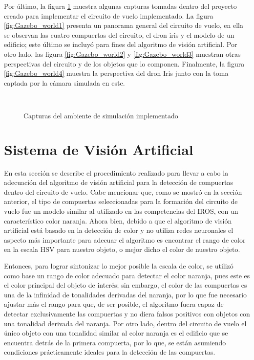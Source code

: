 Por último, la figura \ref{fig:Gazebo_worlds} muestra algunas capturas tomadas dentro del proyecto creado para implementar el circuito de vuelo implementado. La figura \ref{fig:Gazebo_world1} presenta un panorama general del circuito de vuelo, en ella se observan las cuatro compuertas del circuito, el dron iris y el modelo de un edificio; este último se incluyó para fines del algoritmo de visión artificial. Por otro lado, las figura \ref{fig:Gazebo_world2} y \ref{fig:Gazebo_world3}  muestran otras perspectivas del circuito y de los objetos que lo componen. Finalmente, la figura \ref{fig:Gazebo_world4} muestra la perspectiva del dron Iris junto con la toma captada por la cámara simulada en este.

\begin{figure}[ht]
    \centering
    \hfill
    \\
    \hfill
    \hfill

    \caption{Capturas del ambiente de simulación implementado}
    \label{fig:Gazebo_worlds}
\end{figure}

\newpage


\section{Sistema de Visión Artificial}
En esta sección se describe el procedimiento realizado para llevar a cabo la adecuación del algoritmo de visión artificial para la detección de compuertas dentro del circuito de vuelo. Cabe mencionar que, como se mostró en la sección anterior, el tipo de compuertas seleccionadas para la formación del circuito de vuelo fue un modelo similar al utilizado en las competencias del IROS, con un característico color naranja. Ahora bien, debido a que el algoritmo de visión artificial está basado en la detección de color y no utiliza redes neuronales el aspecto más importante para adecuar el algoritmo es encontrar el rango de color en la escala HSV para nuestro objeto, o mejor dicho el color de nuestro objeto.

Entonces, para lograr sintonizar lo mejor posible la escala de color, se utilizó como base un rango de color adecuado para detectar el color naranja, pues este es el color principal del objeto de interés; sin embargo, el color de las compuertas es una de la infinidad de tonalidades derivadas del naranja, por lo que fue necesario ajustar más el rango para que, de ser posible, el algoritmo fuera capaz de detectar exclusivamente las compuertas y no diera falsos positivos con objetos con una tonalidad derivada del naranja. Por otro lado, dentro del circuito de vuelo el único objeto con una tonalidad similar al color naranja es el edificio que se encuentra detrás de la primera compuerta, por lo que, se están asumiendo condiciones prácticamente ideales para la detección de las compuertas.

